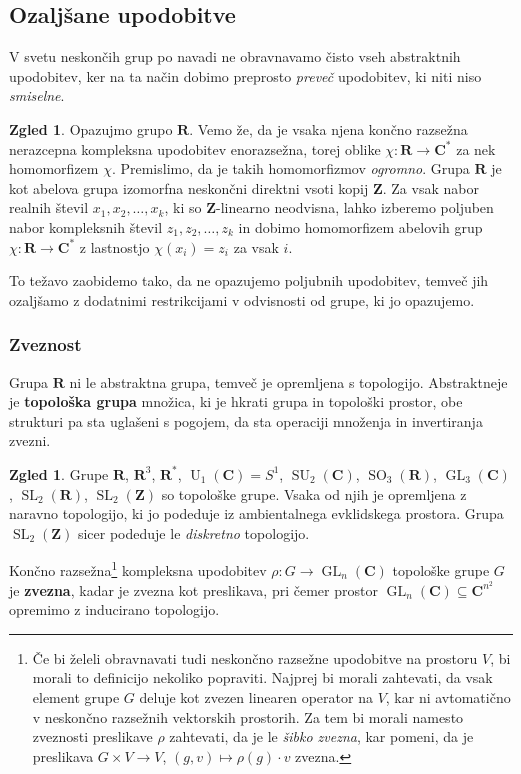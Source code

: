 \documentclass[11pt]{book}
\def\ZZ{\mathbf{Z}}
\def\RR{\mathbf{R}}
\def\CC{\mathbf{C}}
\DeclareMathOperator\SU{SU}
\DeclareMathOperator\GL{GL}
\DeclareMathOperator\U{U}
\DeclareMathOperator\SL{SL}
\DeclareMathOperator\SO{SO}
\def\definicija{\color{rdeca}\bf}
\theoremstyle{definition}
\theoremstyle{zgled}
\newtheorem{zgled}[theorem]{Zgled}
\theoremstyle{zgledbrezstevilke}
\theoremstyle{odprtproblem}
\theoremstyle{domacanaloga}
\theoremstyle{izrek}
\begin{document}
\subsection{Ozaljšane upodobitve}

V svetu neskončih grup po navadi ne obravnavamo čisto vseh abstraktnih upodobitev, ker na ta način dobimo preprosto \emph{preveč} upodobitev, ki niti niso \emph{smiselne}.

\begin{zgled}
Opazujmo grupo $\RR$. Vemo že, da je vsaka njena končno razsežna nerazcepna kompleksna upodobitev enorazsežna, torej oblike $\chi \colon \RR \to \CC^*$ za nek homomorfizem $\chi$. Premislimo, da je takih homomorfizmov \emph{ogromno}. Grupa $\RR$ je kot abelova grupa izomorfna neskončni direktni vsoti kopij $\ZZ$. Za vsak nabor realnih števil $x_1, x_2, \dots, x_k$, ki so $\ZZ$-linearno neodvisna, lahko izberemo poljuben nabor kompleksnih števil $z_1, z_2, \dots, z_k$ in dobimo homomorfizem abelovih grup $\chi \colon \RR \to \CC^*$ z lastnostjo $\chi(x_i) = z_i$ za vsak $i$.
\end{zgled}

To težavo zaobidemo tako, da ne opazujemo poljubnih upodobitev, temveč jih ozaljšamo z dodatnimi restrikcijami v odvisnosti od grupe, ki jo opazujemo. 

\subsubsection{Zveznost}

Grupa $\RR$ ni le abstraktna grupa, temveč je opremljena s topologijo. Abstraktneje je {\definicija topološka grupa} množica, ki je hkrati grupa in topološki prostor, obe strukturi pa sta uglašeni s pogojem, da sta operaciji množenja in invertiranja zvezni. 

\begin{zgled}
Grupe $\RR$, $\RR^3$, $\RR^*$, $\U_1(\CC) = S^1$, $\SU_2(\CC)$, $\SO_3(\RR)$, $\GL_3(\CC)$, $\SL_2(\RR)$, $\SL_2(\ZZ)$ so topološke grupe. Vsaka od njih je opremljena z naravno topologijo, ki jo podeduje iz ambientalnega evklidskega prostora. Grupa $\SL_2(\ZZ)$ sicer podeduje le \emph{diskretno} topologijo.
\end{zgled}

Končno razsežna\footnote{Če bi želeli obravnavati tudi neskončno razsežne upodobitve na prostoru $V$, bi morali to definicijo nekoliko popraviti. Najprej bi morali zahtevati, da vsak element grupe $G$ deluje kot zvezen linearen operator na $V$, kar ni avtomatično v neskončno razsežnih vektorskih prostorih. Za tem bi morali namesto zveznosti preslikave $\rho$ zahtevati, da je le \emph{šibko zvezna}, kar pomeni, da je preslikava $G \times V \to V$, $(g,v) \mapsto \rho(g) \cdot v$ zvezna.} kompleksna upodobitev $\rho \colon G \to \GL_n(\CC)$ topološke grupe $G$ je {\definicija zvezna}, kadar je zvezna kot preslikava, pri čemer prostor $\GL_n(\CC) \subseteq \CC^{n^2}$ opremimo z inducirano topologijo.
\end{document}
